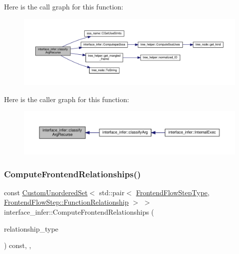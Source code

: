Here is the call graph for this function\+:
\nopagebreak
\begin{figure}[H]
\begin{center}
\leavevmode
\includegraphics[width=350pt]{d9/d8a/classinterface__infer_ab036c9a72e643238236d229c1eb875a6_cgraph}
\end{center}
\end{figure}
Here is the caller graph for this function\+:
\nopagebreak
\begin{figure}[H]
\begin{center}
\leavevmode
\includegraphics[width=350pt]{d9/d8a/classinterface__infer_ab036c9a72e643238236d229c1eb875a6_icgraph}
\end{center}
\end{figure}
\mbox{\label{classinterface__infer_a160b24c511a07dff732ed211f01bb81a}} 
\subsubsection{\texorpdfstring{Compute\+Frontend\+Relationships()}{ComputeFrontendRelationships()}}
{\footnotesize\ttfamily const \hyperlink{classCustomUnorderedSet}{Custom\+Unordered\+Set}$<$ std\+::pair$<$ \hyperlink{frontend__flow__step_8hpp_afeb3716c693d2b2e4ed3e6d04c3b63bb}{Frontend\+Flow\+Step\+Type}, \hyperlink{classFrontendFlowStep_af7cf30f2023e5b99e637dc2058289ab0}{Frontend\+Flow\+Step\+::\+Function\+Relationship} $>$ $>$ interface\+\_\+infer\+::\+Compute\+Frontend\+Relationships (\begin{DoxyParamCaption}\item[{const \hyperlink{classDesignFlowStep_a723a3baf19ff2ceb77bc13e099d0b1b7}{Design\+Flow\+Step\+::\+Relationship\+Type}}]{relationship\+\_\+type }\end{DoxyParamCaption}) const\hspace{0.3cm}{\ttfamily [override]}, {\ttfamily [private]}, {\ttfamily [virtual]}}



